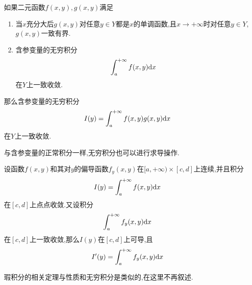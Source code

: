 \documentclass{ctexart}
\begin{document}
\begin{formal}[1.5 Abel判别法]
    如果二元函数$f(x,y),g(x,y)$满足
    \begin{enumerate}[topsep=0pt,parsep=0pt,itemsep=0pt,partopsep=0pt,leftmargin=*,label=\tbf{(\arabic*)}]
        \item 当$x$充分大后$g(x,y)$对任意$y\in Y$都是$x$的单调函数,且$x\to+\infty$时对任意$y\in Y$,$g(x,y)$一致有界.
        \item 含参变量的无穷积分
            \[\int_a^{+\infty}f(x,y)\mathrm{d} x\]
            在$Y$上一致收敛.
    \end{enumerate}
    那么含参变量的无穷积分
    \[I(y)=\int_a^{+\infty}f(x,y)g(x,y)\mathrm{d} x\]
    在$Y$上一致收敛.
\end{formal}
与含参变量的正常积分一样,无穷积分也可以进行求导操作.
\begin{formal}[1.6 含参变量无穷积分的可微性]
    设函数$f(x,y)$和其对$y$的偏导函数$f_y(x,y)$在$[a,+\infty)\times[c,d]$上连续,并且积分
    \[I(y)=\int_a^{+\infty}f(x,y)\mathrm{d} x\]
    在$[c,d]$上点点收敛.又设积分
    \[\int_a^{+\infty}f_y(x,y)\mathrm{d} x\]
    在$[c,d]$上一致收敛,那么$I(y)$在$[c,d]$上可导,且
    \[I'(y)=\int_a^{+\infty}f_y(x,y)\mathrm{d} x\]

\end{formal}
瑕积分的相关定理与性质和无穷积分是类似的,在这里不再叙述.\\
\end{document}
